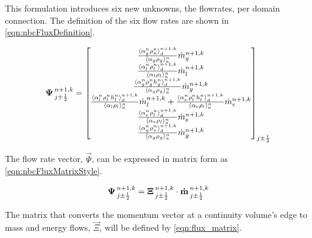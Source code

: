 This formulation introduces six new unknowns, the flowrates, per domain connection.
The definition of the six flow rates are shown in \eqref{eqn:nbcFluxDefinition}.

\begin{equation}
\label{eqn:nbcFluxDefinition}
\vec{\Psi}^{n+1, k}_{j \pm \onehalf} = \begin{bmatrix}
\frac{\don{\alpha^{n}_{g} \rho^{n}_{n}}^{n+1,k}_{d}}{\ave{\alpha_{g} \rho_{g}}^{n}_{a}}\dot{m}^{n+1,k}_{g} \\
%
\frac{\don{\alpha^{n}_{l}\rho^{n}_{l}}^{n+1,k}_{d}}{\ave{\alpha_{l} \rho_{l}}^{n}_{a}}\dot{m}^{n+1,k}_{l}\\
%
\frac{\don{\alpha^{n}_{g} \rho^{n}_{g} h^{n}_{g}}^{n+1,k}_{d}}{\ave{\alpha_{g} \rho_{g}}^{n}_{a}}\dot{m}^{n+1, k}_{g}\\
%
\frac{\don{\alpha^{n}_{l}\rho^{n}_{l} h^{n}_{l}}^{n+1,k}_{d}}{\ave{\alpha_{l} \rho_{l}}^{n}_{a}}\dot{m}^{n+1, k}_{l} +\frac{\don{\alpha^{n}_{e} \rho^{n}_{l} h^{n}_{l}}^{n+1, k}_{d}}{\ave{\alpha_{e} \rho_{l}}^{n}_{a}}\dot{m}^{n+1, k}_{e} \\
%
\frac{ \don{\alpha^{n}_{e} \rho^{n}_{l}}^{n+1, k}_{d}}{ \ave{\alpha_{e} \rho_{l}}^{n}_{a}} \dot{m}^{n+1, k}_{e} \\
%
\frac{ \don{\alpha^{n}_{g} \rho^{n}_{v}}^{n+1, k}_{d}}{ \ave{\alpha_{g} \rho_{g}}^{n}_{a}} \dot{m}^{n+1, k}_{g}
\end{bmatrix}_{j \pm \onehalf}
\end{equation}

The flow rate vector, $\vec{\Psi}$, can be expressed in matrix form as \eqref{eqn:nbcFluxMatrixStyle}.

\begin{equation}
\label{eqn:nbcFluxMatrixStyle}
\vec{\Psi}^{n+1, k}_{j \pm \onehalf} = \vec{\Xi}^{n+1, k}_{j \pm \onehalf} \cdot \vec{\dot{m}}^{n+1, k}_{j \pm \onehalf}
\end{equation}

The matrix that converts the momentum vector at a continuity volume's edge to mass and energy flows, $\vec{\Xi}$, will be defined by \eqref{eqn:flux_matrix}.

